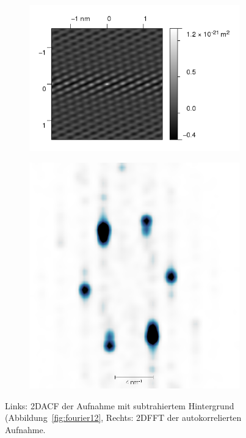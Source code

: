 \begin{figure}
    \begin{subfigure}[b]{\picwidth}
        \includegraphics[width=\textwidth]{pics/fourier4}
    \end{subfigure}\qquad
    \begin{subfigure}[b]{\picwidth}
        \includegraphics[width=\textwidth]{pics/fourier5}
    \end{subfigure}
    \caption{Links: 2DACF der Aufnahme mit subtrahiertem Hintergrund (Abbildung~\ref{fig:fourier12},
    Rechts: 2DFFT der autokorrelierten Aufnahme.}
    \label{fig:fourier5}
\end{figure}


\clearpage
